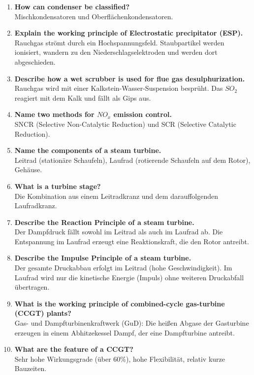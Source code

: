\documentclass{article}
\begin{document}
\begin{enumerate}
    \item \textbf{How can condenser be classified?} \\
    Mischkondensatoren und Oberflächenkondensatoren.
    \item \textbf{Explain the working principle of Electrostatic precipitator (ESP).} \\
    Rauchgas strömt durch ein Hochspannungsfeld. Staubpartikel werden ionisiert, wandern zu den Niederschlagselektroden und werden dort abgeschieden.
    \item \textbf{Describe how a wet scrubber is used for flue gas desulphurization.} \\
    Rauchgas wird mit einer Kalkstein-Wasser-Suspension besprüht. Das $SO_2$ reagiert mit dem Kalk und fällt als Gips aus.
    \item \textbf{Name two methods for $NO_{x}$ emission control.} \\
    SNCR (Selective Non-Catalytic Reduction) und SCR (Selective Catalytic Reduction).
    \item \textbf{Name the components of a steam turbine.} \\
    Leitrad (stationäre Schaufeln), Laufrad (rotierende Schaufeln auf dem Rotor), Gehäuse.
    \item \textbf{What is a turbine stage?} \\
    Die Kombination aus einem Leitradkranz und dem darauffolgenden Laufradkranz.
    \item \textbf{Describe the Reaction Principle of a steam turbine.} \\
    Der Dampfdruck fällt sowohl im Leitrad als auch im Laufrad ab. Die Entspannung im Laufrad erzeugt eine Reaktionskraft, die den Rotor antreibt.
    \item \textbf{Describe the Impulse Principle of a steam turbine.} \\
    Der gesamte Druckabbau erfolgt im Leitrad (hohe Geschwindigkeit). Im Laufrad wird nur die kinetische Energie (Impuls) ohne weiteren Druckabfall übertragen.
    \item \textbf{What is the working principle of combined-cycle gas-turbine (CCGT) plants?} \\
    Gas- und Dampfturbinenkraftwerk (GuD): Die heißen Abgase der Gasturbine erzeugen in einem Abhitzekessel Dampf, der eine Dampfturbine antreibt.
    \item \textbf{What are the feature of a CCGT?} \\
    Sehr hohe Wirkungsgrade (über 60\%), hohe Flexibilität, relativ kurze Bauzeiten.

\end{enumerate}
\end{document}

